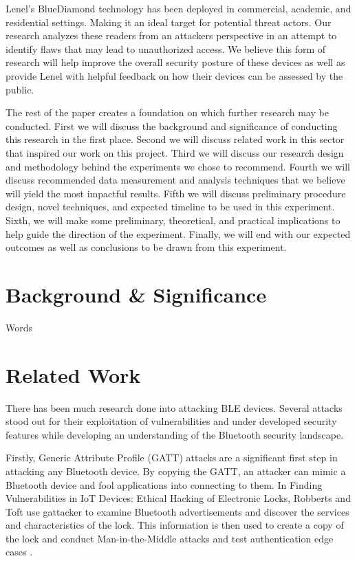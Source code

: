 \documentclass[10pt,twocolumn,letterpaper]{article}
\begin{document}
Lenel's BlueDiamond technology has been deployed in commercial, academic, and residential settings. Making it an ideal target for potential threat actors. Our research analyzes these readers from an attackers perspective in an attempt to identify flaws that may lead to unauthorized access. We believe this form of research will help improve the overall security posture of these devices as well as provide Lenel with helpful feedback on how their devices can be assessed by the public.

The rest of the paper creates a foundation on which further research may be conducted. First we will discuss the background and significance of conducting this research in the first place. Second we will discuss related work in this sector that inspired our work on this project. Third we will discuss our research design and methodology behind the experiments we chose to recommend. Fourth we will discuss recommended data measurement and analysis techniques that we believe will yield the most impactful results. Fifth we will discuss preliminary procedure design, novel techniques, and expected timeline to be used in this experiment. Sixth, we will make some preliminary, theoretical, and practical implications to help guide the direction of the experiment. Finally, we will end with our expected outcomes as well as conclusions to be drawn from this experiment.

\section{Background \& Significance}
Words

\section{Related Work}
There has been much research done into attacking BLE devices. Several attacks stood out for their exploitation of vulnerabilities and under developed security features while developing an understanding of the Bluetooth security landscape.

Firstly, Generic Attribute Profile (GATT) attacks are a significant first step in attacking any Bluetooth device. By copying the GATT, an attacker can mimic a Bluetooth device and fool applications into connecting to them. In Finding Vulnerabilities in IoT Devices: Ethical Hacking of Electronic Locks, Robberts and Toft use gattacker to examine Bluetooth advertisements and discover the services and characteristics of the lock. This information is then used to create a copy of the lock and conduct Man-in-the-Middle attacks and test authentication edge cases \cite{KTH}.
\end{document}
